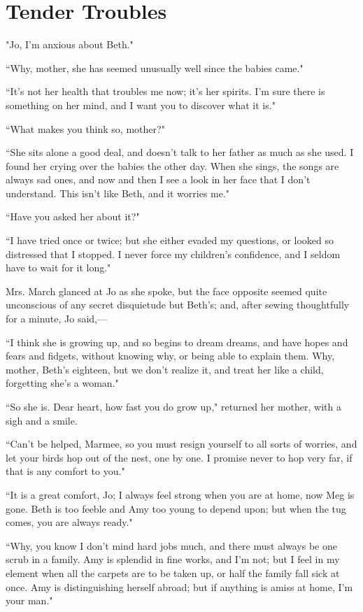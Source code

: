 \chapter{Tender Troubles}


"{Jo}, I'm anxious about Beth."

``Why, mother, she has seemed unusually well since the babies came."

``It's not her health that troubles me now;
it's her spirits. I'm sure there is
something on her mind, and I want you to discover what it is."

``What makes you think so, mother?"

``She sits alone a good deal, and doesn't talk to her
father as much as she used. I found her crying over the babies the other
day. When she sings, the songs are always sad ones, and now and then I
see a look in her face that I don't understand. This
isn't like Beth, and it worries me."

``Have you asked her about it?"

``I have tried once or twice; but she either evaded my questions, or
looked so distressed that I stopped. I never force my
children's confidence, and I seldom have to wait for it
long."

Mrs. March glanced at Jo as she spoke, but the face opposite seemed
quite unconscious of any secret disquietude but Beth's;
and, after sewing thoughtfully for a minute, Jo said,---

``I think she is growing up, and so begins to dream dreams, and have
hopes and fears and fidgets, without knowing why, or being able to
explain them. Why, mother, Beth's eighteen, but we
don't realize it, and treat her like a child, forgetting
she's a woman."

``So she is. Dear heart, how fast you do grow up," returned her mother,
with a sigh and a smile.

``Can't be helped, Marmee, so you must resign yourself to
all sorts of worries, and let your birds hop out of the nest, one by
one. I promise never to hop very far, if that is any comfort to you."

``It is a great comfort, Jo; I always feel strong when you are at home,
now Meg is gone. Beth is too feeble and Amy too young to depend upon;
but when the tug comes, you are always ready."

``Why, you know I don't mind hard jobs much, and there
must always be one scrub in a family. Amy is splendid in fine works, and
I'm not; but I feel in my element when all the carpets
are to be taken up, or half the family fall sick at once. Amy is
distinguishing herself abroad; but if anything is amiss at home,
I'm your man."

